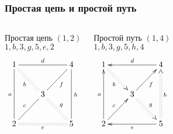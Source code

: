 \begin{frame}
    \frametitle{Простая цепь и простой путь}

    \begin{columns}
            \begin{block}{Простая цепь $(1,2)$\\$1,b,3,g,5,e,2$}
                \[
                    {\xymatrix{
                        1 \ar@{-}[dd]_{a} \ar@{-}[rr]^{d} \ar@{:}[dr]_{b}
                            &*{}
                                &4 \ar@{-}[dd]^{h}
                                    \\
                        *{} 
                            &3 \ar@{-}[ur]_{f} \ar@{:}[dr]^{g}
                                &*{}
                                    \\
                        2  \ar@{-}[ur]^{c} \ar@{:}[rr]_{e}
                            &*{}
                                &5
                    }}
                \]
            \end{block}
        
            \begin{block}{Простой путь $(1,4)$\\$1,b,3,g,5,h,4$}
                \[
                    {\xymatrix{
                        1 \ar@{<-}[dd]_{a} \ar@{<-}[rr]^{d} \ar@{:>}[dr]_{b}
                            &*{}
                                &4 \ar@{<:}[dd]^{h}
                                    \\
                        *{} 
                            &3 \ar@{->}[ur]_{f} \ar@{:>}[dr]^{g}
                                &*{}
                                    \\
                        2  \ar@{->}[ur]^{c} \ar@{<-}[rr]_{e}
                            &*{}
                                &5
                    }}
                \]
            \end{block}
    \end{columns}
\end{frame}

